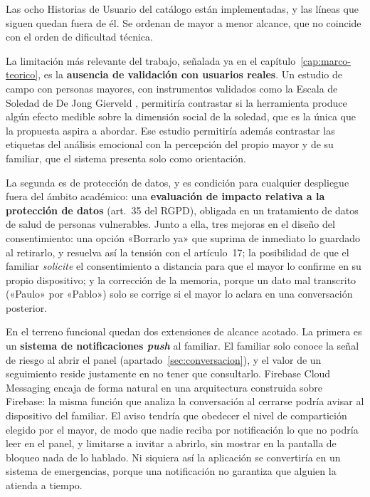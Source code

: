 Las ocho Historias de Usuario del catálogo están implementadas, y las líneas que siguen quedan fuera de él. Se ordenan de mayor a menor alcance, que no coincide con el orden de dificultad técnica.

La limitación más relevante del trabajo, señalada ya en el capítulo~\ref{cap:marco-teorico}, es la \textbf{ausencia de validación con usuarios reales}. Un estudio de campo con personas mayores, con instrumentos validados como la Escala de Soledad de De Jong Gierveld \citep{DeJongGierveld2010}, permitiría contrastar si la herramienta produce algún efecto medible sobre la dimensión social de la soledad, que es la única que la propuesta aspira a abordar. Ese estudio permitiría además contrastar las etiquetas del análisis emocional con la percepción del propio mayor y de su familiar, que el sistema presenta solo como orientación.

La segunda es de protección de datos, y es condición para cualquier despliegue fuera del ámbito académico: una \textbf{evaluación de impacto relativa a la protección de datos} (art.~35 del RGPD), obligada en un tratamiento de datos de salud de personas vulnerables. Junto a ella, tres mejoras en el diseño del consentimiento: una opción «Borrarlo ya» que suprima de inmediato lo guardado al retirarlo, y resuelva así la tensión con el artículo~17; la posibilidad de que el familiar \emph{solicite} el consentimiento a distancia para que el mayor lo confirme en su propio dispositivo; y la corrección de la memoria, porque un dato mal transcrito («Paulo» por «Pablo») solo se corrige si el mayor lo aclara en una conversación posterior.

En el terreno funcional quedan dos extensiones de alcance acotado. La primera es un \textbf{sistema de notificaciones \textit{push}} al familiar. El familiar solo conoce la señal de riesgo al abrir el panel (apartado~\ref{sec:conversacion}), y el valor de un seguimiento reside justamente en no tener que consultarlo. Firebase Cloud Messaging encaja de forma natural en una arquitectura construida sobre Firebase: la misma función que analiza la conversación al cerrarse podría avisar al dispositivo del familiar. El aviso tendría que obedecer el nivel de compartición elegido por el mayor, de modo que nadie reciba por notificación lo que no podría leer en el panel, y limitarse a invitar a abrirlo, sin mostrar en la pantalla de bloqueo nada de lo hablado. Ni siquiera así la aplicación se convertiría en un sistema de emergencias, porque una notificación no garantiza que alguien la atienda a tiempo.

